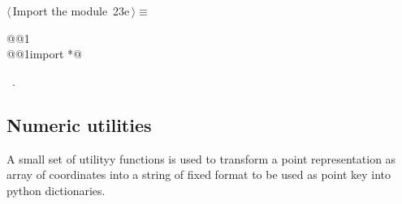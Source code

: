 \documentclass[11pt,oneside]{article}	%
\begin{document}
\begin{flushleft} \small \label{scrap49}
\protect{}$\langle\,$Import the module\nobreak\ {\footnotesize 23e}$\,\rangle\equiv$
\vspace{-1ex}
\begin{list}{}{} \item
\mbox{}\verb@import @@1\verb@@\\
\mbox{}\verb@from @@1\verb@ import *@\\
\mbox{}\verb@@{\NWsep}
\end{list}
\vspace{-1ex}
\footnotesize\addtolength{\baselineskip}{-1ex}
\begin{list}{}{\setlength{\itemsep}{-\parsep}\setlength{\itemindent}{-\leftmargin}}
\item \NWtxtMacroRefIn\ .
\end{list}
\end{flushleft}


\subsection{Numeric utilities}

A small set of utilityy functions is used to transform a point representation as array of coordinates into a string of fixed format to be used as point key into python dictionaries.
\end{document}

